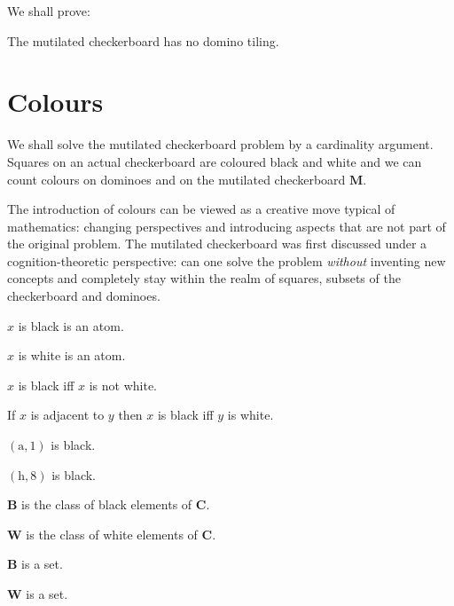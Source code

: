 \documentclass{article}
\newcommand{\fileA}{\mathrm{a}}
\newcommand{\fileH}{\mathrm{h}}
\newcommand{\Checkerboard}{\mathbf{C}}
\newcommand{\Mutilated}{\mathbf{M}}
\newcommand{\Black}{\mathbf{B}}
\newcommand{\White}{\mathbf{W}}
\begin{document}
\noindent
We shall prove:

\begin{quotedtheorem}
    The mutilated checkerboard has no domino tiling.
\end{quotedtheorem}



\section{Colours}

We shall solve the mutilated checkerboard problem by a cardinality argument.
Squares on an actual checkerboard are coloured black and white and we can count
colours on dominoes and on the mutilated checkerboard $\Mutilated$.

The introduction of colours can be viewed as a creative move typical of
mathematics: changing perspectives and introducing aspects that are not part
of the original problem. The mutilated checkerboard was first discussed under
a cognition-theoretic perspective: can one solve the problem \emph{without}
inventing new concepts and completely stay within the realm of squares,
subsets of the checkerboard and dominoes.


\begin{forthel}
    \begin{signature} $x$ is black is an atom. \end{signature}
    \begin{signature} $x$ is white is an atom. \end{signature}

    \begin{axiom} $x$ is black iff $x$ is not white. \end{axiom}
    \begin{axiom} If $x$ is adjacent to $y$ then $x$ is black iff $y$ is white. \end{axiom}

    \begin{axiom} $(\fileA,1)$ is black. \end{axiom}
    \begin{axiom} $(\fileH,8)$ is black. \end{axiom}

    \begin{definition} $\Black$ is the class of black elements of $\Checkerboard$. \end{definition}
    \begin{definition} $\White$ is the class of white elements of $\Checkerboard$. \end{definition}

    \begin{lemma} $\Black$ is a set. \end{lemma}
    \begin{lemma} $\White$ is a set. \end{lemma}
\end{forthel}
\end{document}
